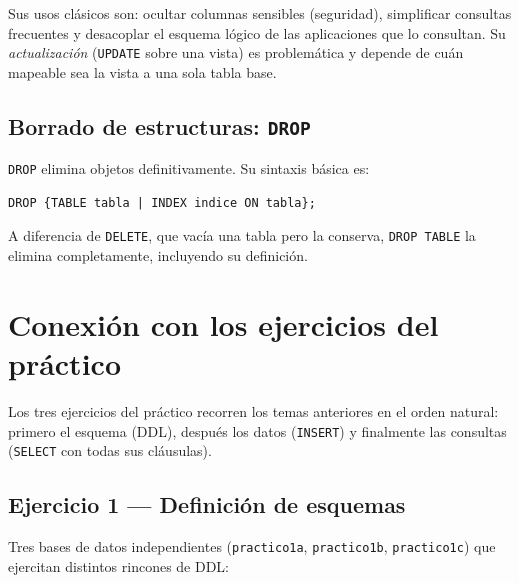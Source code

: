 \documentclass[11pt,a4paper]{article}
\begin{document}
Sus usos clásicos son: ocultar columnas sensibles (seguridad), simplificar
consultas frecuentes y desacoplar el esquema lógico de las aplicaciones que
lo consultan. Su \emph{actualización} (\texttt{UPDATE} sobre una vista) es
problemática y depende de cuán mapeable sea la vista a una sola tabla base.

\subsection{Borrado de estructuras: \texttt{DROP}}

\texttt{DROP} elimina objetos definitivamente. Su sintaxis básica es:

\begin{lstlisting}
DROP {TABLE tabla | INDEX indice ON tabla};
\end{lstlisting}

A diferencia de \texttt{DELETE}, que vacía una tabla pero la conserva,
\texttt{DROP TABLE} la elimina completamente, incluyendo su definición.

\section{Conexión con los ejercicios del práctico}

Los tres ejercicios del práctico recorren los temas anteriores en el orden
natural: primero el esquema (DDL), después los datos (\texttt{INSERT}) y
finalmente las consultas (\texttt{SELECT} con todas sus cláusulas).

\subsection*{Ejercicio 1 --- Definición de esquemas}

Tres bases de datos independientes (\texttt{practico1a}, \texttt{practico1b},
\texttt{practico1c}) que ejercitan distintos rincones de DDL:
\end{document}
